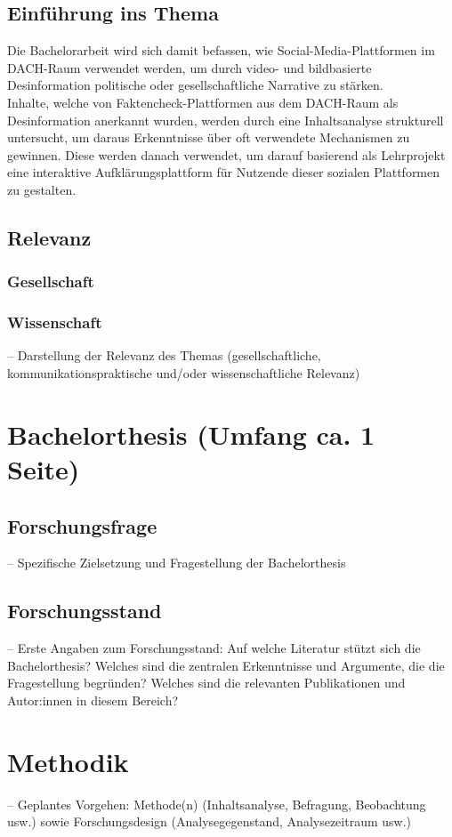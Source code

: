 \documentclass[12pt,a4paper]{article}        %
\begin{document}
\subsection{Einführung ins Thema}
Die Bachelorarbeit wird sich damit befassen, wie Social-Media-Plattformen im DACH-Raum verwendet werden, um durch video- und bildbasierte Desinformation politische oder gesellschaftliche Narrative zu stärken. \\
Inhalte, welche von Faktencheck-Plattformen aus dem DACH-Raum als Desinformation anerkannt wurden, werden durch eine Inhaltsanalyse strukturell untersucht, um daraus Erkenntnisse über oft verwendete Mechanismen zu gewinnen. Diese werden danach verwendet, um darauf basierend als Lehrprojekt eine interaktive Aufklärungsplattform für Nutzende dieser sozialen Plattformen zu gestalten.

\subsection{Relevanz}
\subsubsection{Gesellschaft}
\subsubsection{Wissenschaft}
– Darstellung der Relevanz des Themas (gesellschaftliche, kommunikationspraktische und/oder wissenschaftliche Relevanz)
\section{Bachelorthesis (Umfang ca. 1 Seite)}
\subsection{Forschungsfrage}
– Spezifische Zielsetzung und Fragestellung der Bachelorthesis
\subsection{Forschungsstand}
– Erste Angaben zum Forschungsstand: Auf welche Literatur stützt sich die Bachelorthesis? Welches sind die zentralen Erkenntnisse und Argumente, die die Fragestellung begründen? Welches sind die relevanten Publikationen und Autor:innen in diesem Bereich?
\section{Methodik}
– Geplantes Vorgehen: Methode(n) (Inhaltsanalyse, Befragung, Beobachtung usw.) sowie Forschungsdesign (Analysegegenstand, Analysezeitraum usw.)
\end{document}
